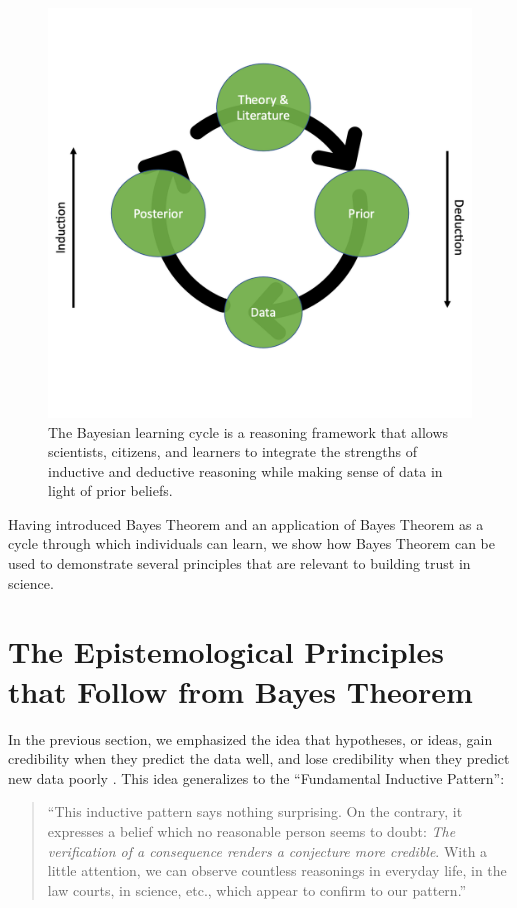 \documentclass[man]{apa7}
\begin{document}
\begin{figure}[h]
\begin{center}
\includegraphics[width = .65\paperwidth]{learning.png}
\caption{The Bayesian learning cycle is a reasoning framework that allows scientists, citizens, and learners to integrate the strengths of inductive and deductive reasoning while making sense of data in light of prior beliefs.}
\label{fig:The Bayesian Learning Cycle}
\end{center}
\end{figure}
Having introduced Bayes Theorem and an application of Bayes Theorem as a cycle through which individuals can learn, we show how Bayes Theorem can be used to demonstrate several principles that are relevant to building trust in science.

\section{The Epistemological Principles that Follow from Bayes Theorem}

In the previous section, we emphasized the idea that hypotheses, or ideas, gain credibility when they predict the data well, and lose credibility when they predict new data poorly \parencite{WagenmakersEtAl2016CD}. This idea generalizes to the ``Fundamental Inductive Pattern'':
\begin{quotation}
``This inductive pattern says nothing surprising. On the contrary, it expresses a belief which no reasonable person seems to doubt: \emph{The verification of a consequence renders a conjecture more credible}. With a little attention, we can observe countless reasonings in everyday life, in the law courts, in science, etc., which appear to confirm to our pattern.'' \parencite[pp. 4-5]{Polya1954Vol2}
\end{quotation}
\end{document}
